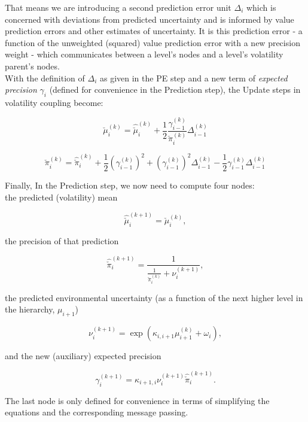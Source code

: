 That means we are introducing a second prediction error unit $\Delta_i$ which is concerned with deviations from predicted uncertainty and is informed by value prediction errors and other estimates of uncertainty. It is this prediction error - a function of the unweighted (squared) value prediction error with a new precision weight - which communicates between a level's nodes and a level's volatility parent's nodes.\\

With the definition of $\Delta_i$ as given in the \textsf{PE} step and a new term of \textit{expected precision} $\gamma_i$ (defined for convenience in the \textsf{Prediction} step), the \textsf{Update} steps in volatility coupling become:

\begin{equation}
	\check{\mu}_i^{(k)} = \hat{\check{\mu}}_i^{(k)} + \frac{1}{2} \frac{\gamma_{i-1}^{(k)}}{\check{\pi}_i^{(k)}} \Delta_{i-1}^{(k)}
\end{equation}

\begin{equation}
	\check{\pi}_i^{(k)} = \hat{\check{\pi}}_i^{(k)} + \frac{1}{2} (\gamma_{i-1}^{(k)})^2 + (\gamma_{i-1}^{(k)})^2 \Delta_{i-1}^{(k)} - \frac{1}{2} \gamma_{i-1}^{(k)} \Delta_{i-1}^{(k)}
\end{equation}

Finally, In the \textsf{Prediction} step, we now need to compute four nodes: \\
the predicted (volatility) mean

\begin{equation}
	\hat{\check{\mu}}_i^{(k+1)} = \check{\mu}_i^{(k)},
\end{equation}

the precision of that prediction

\begin{equation}
  \hat{\check{\pi}}_i^{(k+1)} = \frac{1}{\frac{1}{\check{\pi}_i^{(k)}} + \nu_i^{(k+1)}}, 
\end{equation}

the predicted environmental uncertainty (as a function of the next higher level in the hierarchy, $\mu_{i+1}$)

\begin{equation}
  \nu_i^{(k+1)} = \exp(\kappa_{i,i+1} \mu_{i+1}^{(k)} + \omega_i),
\end{equation}

and the new (auxiliary) expected precision

\begin{equation}
  \gamma_i^{(k+1)} = \kappa_{i+1,i} \nu_i^{(k+1)} \hat{\check{\pi}}_i^{(k+1)}.
\end{equation}

The last node is only defined for convenience in terms of simplifying the equations and the corresponding message passing.